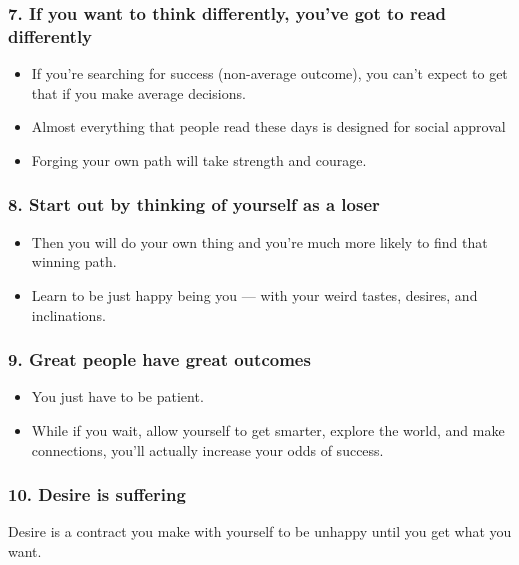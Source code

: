 \begin{frame}[fragile]\frametitle{7. If you want to think differently, you’ve got to read differently}

\begin{itemize}
\item  If you’re searching for success (non-average outcome), you can’t expect
to get that if you make average decisions.
\item  Almost everything that people read these days is designed for social approval
\item Forging your own path will take strength and courage.
\end{itemize}

\end{frame}

\begin{frame}[fragile]\frametitle{8. Start out by thinking of yourself as a loser}

\begin{itemize}
\item   Then you will do your own thing and you’re much more likely to find that
winning path.
\item  Learn to be just happy being you — with your
weird tastes, desires, and inclinations.
\end{itemize}

\end{frame}

\begin{frame}[fragile]\frametitle{9. Great people have great outcomes}

\begin{itemize}
\item   You just have to be patient.
\item  While if you wait, allow yourself to get smarter, explore the world, and make
connections, you’ll actually increase your odds of success.
\end{itemize}

\end{frame}

\begin{frame}[fragile]\frametitle{10. Desire is suffering}

Desire is a contract you make with yourself to be unhappy until you
get what you want.

\end{frame}

